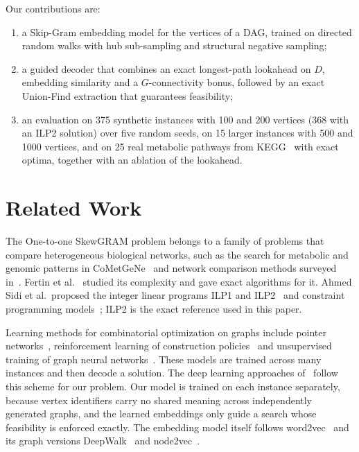 \documentclass{llncs}
\begin{document}
Our contributions are:
\begin{enumerate}
\item a Skip-Gram embedding model for the vertices of a DAG, trained on directed random walks with hub sub-sampling and structural negative sampling;
\item a guided decoder that combines an exact longest-path lookahead on $D$, embedding similarity and a $G$-connectivity bonus, followed by an exact Union-Find extraction that guarantees feasibility;
\item an evaluation on 375 synthetic instances with 100 and 200 vertices (368 with an ILP2 solution) over five random seeds, on 15 larger instances with 500 and 1000 vertices, and on 25 real metabolic pathways from KEGG~\cite{kanehisa2000} with exact optima, together with an ablation of the lookahead.
\end{enumerate}

\section{Related Work}

The One-to-one SkewGRAM problem belongs to a family of problems that compare heterogeneous biological networks, such as the search for metabolic and genomic patterns in CoMetGeNe~\cite{zaharia} and network comparison methods surveyed in~\cite{sharan2006}. Fertin et al.~\cite{fertin2012} studied its complexity and gave exact algorithms for it. Ahmed Sidi et al.\ proposed the integer linear programs ILP1 and ILP2~\cite{sidi2022} and constraint programming models~\cite{sidi}; ILP2 is the exact reference used in this paper.

Learning methods for combinatorial optimization on graphs include pointer networks~\cite{vinyals2015}, reinforcement learning of construction policies~\cite{bello2016,dai2017} and unsupervised training of graph neural networks~\cite{karalias2020}. These models are trained across many instances and then decode a solution. The deep learning approaches of~\cite{sidi_dl} follow this scheme for our problem. Our model is trained on each instance separately, because vertex identifiers carry no shared meaning across independently generated graphs, and the learned embeddings only guide a search whose feasibility is enforced exactly. The embedding model itself follows word2vec~\cite{mikolov} and its graph versions DeepWalk~\cite{perozzi} and node2vec~\cite{grover}.
\end{document}
